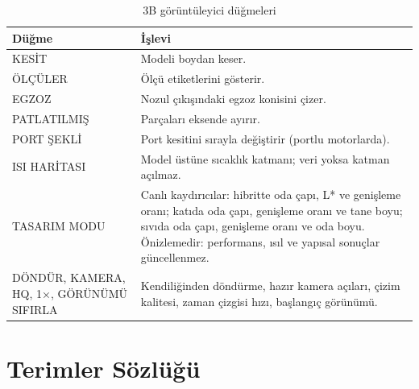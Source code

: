 \documentclass[11pt,a4paper]{article}
\newcommand{\ui}[1]{\textsf{#1}}
\begin{document}
\begin{table}[H]
\centering\small
\caption{3B görüntüleyici düğmeleri}\label{tab:3b}
\begin{tabular}{@{}>{\raggedright\arraybackslash}p{3.6cm}>{\raggedright\arraybackslash}p{12.0cm}@{}}
\toprule
\textbf{Düğme} & \textbf{İşlevi} \\
\midrule
\ui{KESİT} & Modeli boydan keser. \\
\ui{ÖLÇÜLER} & Ölçü etiketlerini gösterir. \\
\ui{EGZOZ} & Nozul çıkışındaki egzoz konisini çizer. \\
\ui{PATLATILMIŞ} & Parçaları eksende ayırır. \\
\ui{PORT ŞEKLİ} & Port kesitini sırayla değiştirir (portlu motorlarda). \\
\ui{ISI HARİTASI} & Model üstüne sıcaklık katmanı; veri yoksa katman açılmaz. \\
\ui{TASARIM MODU} & Canlı kaydırıcılar: hibritte oda çapı, L* ve genişleme oranı; katıda oda çapı, genişleme oranı ve tane boyu; sıvıda oda çapı, genişleme oranı ve oda boyu. Önizlemedir: performans, ısıl ve yapısal sonuçlar güncellenmez. \\
\ui{DÖNDÜR}, \ui{KAMERA}, \ui{HQ}, \ui{1×}, \ui{GÖRÜNÜMÜ SIFIRLA} & Kendiliğinden döndürme, hazır kamera açıları, çizim kalitesi, zaman çizgisi hızı, başlangıç görünümü. \\
\bottomrule
\end{tabular}
\end{table}

\section{Terimler Sözlüğü}\label{sec:ekb}
\end{document}
